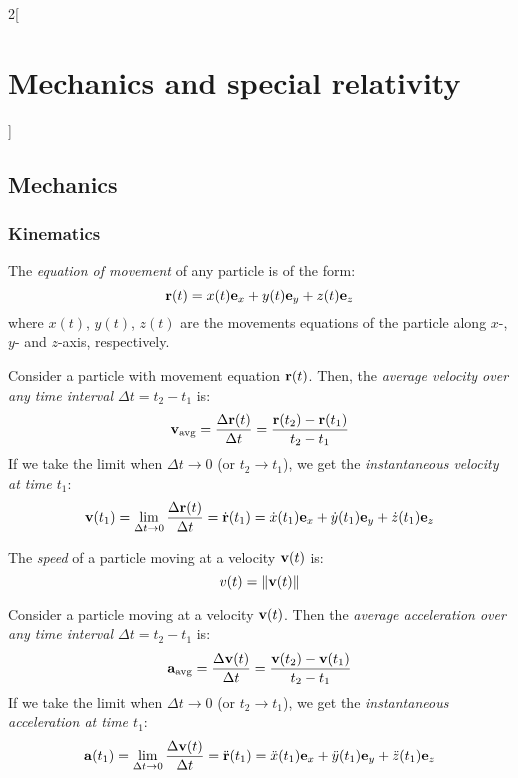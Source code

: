 \documentclass[../../../main.tex]{subfiles}
\begin{document}
\begin{multicols}{2}[\section{Mechanics and special relativity}]
  \subsection{Mechanics}
  \subsubsection*{Kinematics}
  \begin{definition}
    The \textit{equation of movement} of any particle is of the form:
    $$\vb{r}(t)=x(t)\vb{e}_x+y(t)\vb{e}_y+z(t)\vb{e}_z$$ where $x(t)$, $y(t)$, $z(t)$ are the movements equations of the particle along $x$-, $y$- and $z$-axis, respectively.
  \end{definition}
  \begin{definition}
    Consider a particle with movement equation $\vb{r}(t)$. Then, the \textit{average velocity over any time interval $\Delta t=t_2-t_1$} is:
    $$\vb{v}_\text{avg}=\frac{\Delta\vb{r}(t)}{\Delta t}=\frac{\vb{r}(t_2)-\vb{r}(t_1)}{t_2-t_1}$$
    If we take the limit when $\Delta t\to0$ (or $t_2\to t_1$), we get the \textit{instantaneous velocity at time $t_1$}: $$\vb{v}(t_1)=\lim_{\Delta t\to 0}\frac{\Delta\vb{r}(t)}{\Delta t}=\dot{\vb{r}}(t_1)=\dot{x}(t_1)\vb{e}_x+\dot{y}(t_1)\vb{e}_y+\dot{z}(t_1)\vb{e}_z$$
  \end{definition}
  \begin{definition}
    The \textit{speed} of a particle moving at a velocity $\vb{v}(t)$ is:
    $$v(t)=\|\vb{v}(t)\|$$
  \end{definition}
  \begin{definition}
    Consider a particle moving at a velocity $\vb{v}(t)$. Then the \textit{average acceleration over any time interval $\Delta t=t_2-t_1$} is:
    $$\vb{a}_\text{avg}=\frac{\Delta\vb{v}(t)}{\Delta t}=\frac{\vb{v}(t_2)-\vb{v}(t_1)}{t_2-t_1}$$
    If we take the limit when $\Delta t\to0$ (or $t_2\to t_1$), we get the \textit{instantaneous acceleration at time $t_1$}: $$\vb{a}(t_1)=\lim_{\Delta t\to 0}\frac{\Delta\vb{v}(t)}{\Delta t}=\ddot{\vb{r}}(t_1)=\ddot{x}(t_1)\vb{e}_x+\ddot{y}(t_1)\vb{e}_y+\ddot{z}(t_1)\vb{e}_z$$

\end{definition}
\end{multicols}
\end{document}
